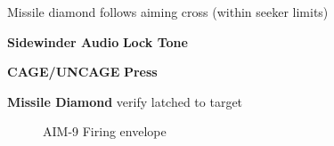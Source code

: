 \begin{checklistenumerate}
{    Missile diamond follows aiming cross (within seeker limits)

    \begin{subenumerate}[start=3]
        \item \textbf{Sidewinder Audio} \dotfill \textbf{Lock Tone}
        \item \textbf{CAGE/UNCAGE} \dotfill \textbf{Press}
        \item \textbf{Missile Diamond} \dotfill verify latched to target
    \end{subenumerate}}
\end{checklistenumerate}

\begin{figure}[htbp]
    \centering
    \caption{AIM-9 Firing envelope}
    \label{fig:aaweap:aim9:envelope}
\end{figure}

\clearpage

